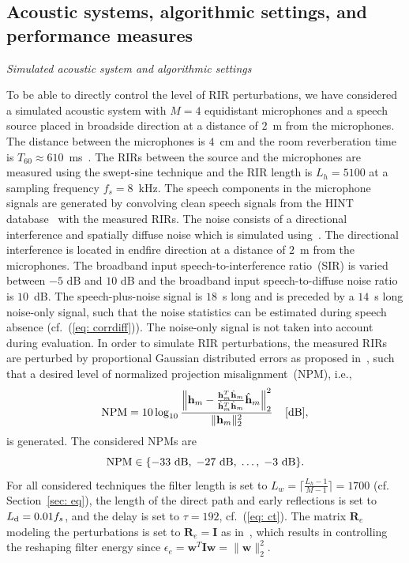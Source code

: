 \documentclass[10pt]{IEEEtran}
\begin{document}
\subsection{Acoustic systems, algorithmic settings, and performance measures}
\label{sec: expa}

\vskip 5pt

\textit{Simulated acoustic system and algorithmic settings} 

\vskip 5pt

To be able to directly control the level of RIR perturbations, we have considered a simulated acoustic system with $M=4$ equidistant microphones and a speech source placed in broadside direction at a distance of $2$~m from the microphones.
The distance between the microphones is $4$~cm and the room reverberation time is $T_{60} \approx 610$~ms~\cite{hadad_IWAENC_2014}.
The RIRs between the source and the microphones are measured using the swept-sine technique and the RIR length is $L_h = 5100$ at a sampling frequency $f_s = 8$~kHz.
The speech components in the microphone signals are generated by convolving clean speech signals from the HINT database~\cite{Nilsson_JASA_1994} with the measured RIRs.
The noise consists of a directional interference and spatially diffuse noise which is simulated using~\cite{Habets2008}.
The directional interference is located in endfire direction at a distance of $2$~m from the microphones.
The broadband input speech-to-interference ratio~(SIR) is varied between $-5$ dB and $10$ dB and the broadband input speech-to-diffuse noise ratio is $10$~dB.
{{The speech-plus-noise signal is $18$~s long and is preceded by a $14$~s long noise-only signal, such that the noise statistics can be estimated during speech absence (cf.~(\ref{eq: corrdiff})).}}
The noise-only signal is not taken into account during evaluation.
In order to simulate RIR perturbations, the measured RIRs are perturbed by proportional Gaussian distributed errors as proposed in~\cite{Zhang_HINDAWI_2008}, such that a desired level of normalized projection misalignment~(NPM), i.e.,
\begin{equation}
{\text{NPM}} = 10 \log_{10} \frac{\left\| \mathbf{h}_m - \frac{\mathbf{h}_m^T\hat{\mathbf{h}}_m}{\hat{\mathbf{h}}_m^T\hat{\mathbf{h}}_m}\hat{\mathbf{h}}_m\right\|_2^2}{\| \mathbf{h}_m \|_2^2} \; \; \; \; [\rm{dB}],
\end{equation}
is generated.
The considered NPMs are
\begin{equation}
\label{eq: npm}
{\text{NPM}} \in \{-33~{\rm dB}, \; -27~{\rm dB}, \; \ldots, \; -3~{\rm dB} \}.
\end{equation}
{{For all considered techniques the filter length is set to $L_w = \lceil{\frac{L_h-1}{M-1}\rceil} = 1700$ (cf. Section~\ref{sec: eq}), the length of the direct path and early reflections is set to $L_{\rm{d}} = 0.01 f_s$, and the delay is set to $\tau = 192$, cf.~(\ref{eq: ct}).}}
The matrix $\mathbf{R}_{e}$ modeling the perturbations is set to $\mathbf{R}_{e} = \mathbf{I}$ as in~\cite{Kodrasi_ITASLP_2013,Hikichi_EURASIP_2007}, which results in controlling the reshaping filter energy since $\epsilon_e = \mathbf{w}^T\mathbf{I}\mathbf{w} = \| \mathbf{w} \|_2^2$.
\end{document}
